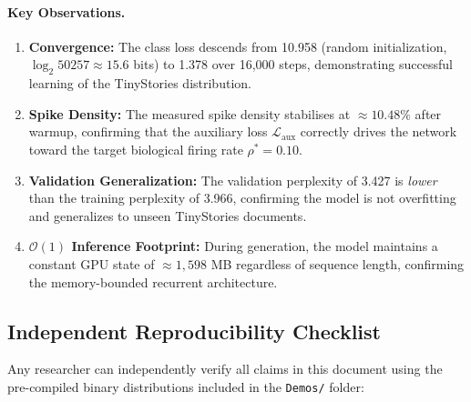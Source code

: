 \documentclass[11pt]{article}
\begin{document}
\paragraph{Key Observations.}
\begin{enumerate}
    \item \textbf{Convergence:} The class loss descends from 10.958 (random initialization, $\log_2 50257 \approx 15.6$ bits) to 1.378 over 16,000 steps, demonstrating successful learning of the TinyStories distribution.
    \item \textbf{Spike Density:} The measured spike density stabilises at $\approx 10.48\%$ after warmup, confirming that the auxiliary loss $\mathcal{L}_{\mathrm{aux}}$ correctly drives the network toward the target biological firing rate $\rho^* = 0.10$.
    \item \textbf{Validation Generalization:} The validation perplexity of 3.427 is \emph{lower} than the training perplexity of 3.966, confirming the model is not overfitting and generalizes to unseen TinyStories documents.
    \item \textbf{$\mathcal{O}(1)$ Inference Footprint:} During generation, the model maintains a constant GPU state of $\approx 1,598$ MB regardless of sequence length, confirming the memory-bounded recurrent architecture.
\end{enumerate}

\subsection{Independent Reproducibility Checklist}
Any researcher can independently verify all claims in this document using the pre-compiled binary distributions included in the \texttt{Demos/} folder:
\end{document}
